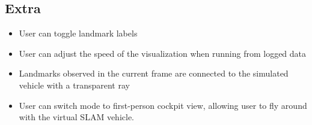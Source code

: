 \documentclass[11pt]{article}
\begin{document}
\subsection*{Extra}
\begin{itemize}
\item User can toggle landmark labels
\item User can adjust the speed of the visualization when running from logged data
\item Landmarks observed in the current frame are connected to the simulated vehicle with a transparent ray
\item User can switch mode to first-person cockpit view, allowing user to fly around with the virtual SLAM vehicle.
\end{itemize}
\end{document}
